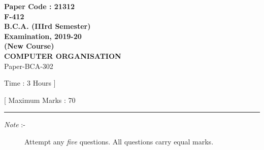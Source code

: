 \documentclass[12pt]{article}
\begin{document}
\pagestyle{empty}

\begin{center}

	\textsf{
		\textbf{
			\LARGE Paper Code : 21312\\
			\normalsize F-412\\
			B.C.A. (IIIrd Semester)\\
			Examination, 2019-20\\
			(New Course)\\
			\small{COMPUTER ORGANISATION\\}
		}
		Paper-BCA-302
	}

	\begin{minipage}{0.49\linewidth}
		\raggedright\footnotesize Time : 3 Hours ]
	\end{minipage}
	\begin{minipage}{0.49\linewidth}
		\raggedleft\footnotesize [ Maximum Marks : 70
	\end{minipage}

\end{center}

\rule{0.9\linewidth}{0.1mm}

\begin{description}
	\item[\textit{Note }:-] Attempt any \textit{five} questions. All questions carry equal marks.
\end{description}
\end{document}
